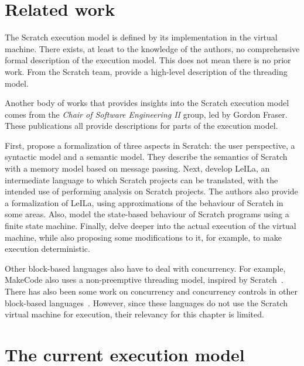 \documentclass[../main]{subfiles}
\begin{document}
\section{Related work}\label{sec:execution-related-work}

The Scratch execution model is defined by its implementation in the virtual machine.
There exists, at least to the knowledge of the authors, no comprehensive formal description of the execution model.
This does not mean there is no prior work.
From the Scratch team, \textcite{maloneyScratchProgrammingLanguage2010} provide a high-level description of the threading model.

Another body of works that provides insights into the Scratch execution model comes from the \emph{Chair of Software Engineering II} group, led by Gordon Fraser.
These publications all provide descriptions for parts of the execution model.

First, \textcite{stahlbauerTestingScratchPrograms2019} propose a formalization of three aspects in Scratch: the user perspective, a syntactic model and a semantic model.
They describe the semantics of Scratch with a memory model based on message passing.
Next, \textcite{stahlbauerVerifiedScratchProgram2020} develop LeILa, an intermediate language to which Scratch projects can be translated, with the intended use of performing analysis on Scratch projects.
The authors also provide a formalization of LeILa, using approximations of the behaviour of Scratch in some areas.
Also, \textcite{gotzModelbasedTestingScratch2022} model the state-based behaviour of Scratch programs using a finite state machine.
Finally, \textcite{deinerAutomatedTestGeneration2023} delve deeper into the actual execution of the virtual machine, while also proposing some modifications to it, for example, to make execution deterministic.

Other block-based languages also have to deal with concurrency.
For example, MakeCode also uses a non-preemptive threading model, inspired by Scratch~\autocite{ballMicrosoftMakeCodeEmbedded2019}.
There has also been some work on concurrency and concurrency controls in other block-based languages~\autocite{chungConCodeItComparisonConcurrency2020}.
However, since these languages do not use the Scratch virtual machine for execution, their relevancy for this chapter is limited.

\section{The current execution model}\label{sec:the-current-execution-model}
\end{document}
